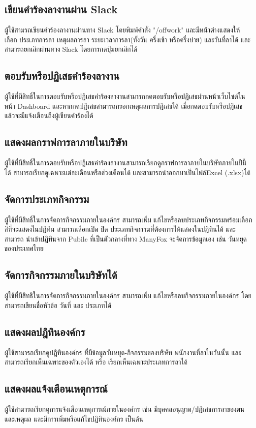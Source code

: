 \subsection{เขียนคำร้องลางานผ่าน Slack}
ผู้ใช้สามรถเขียนคำร้องลางานผ่านทาง Slack โดยพิมพ์คำสั่ง "/offwork" และมีหน้าต่างแสดงให้เลือก ประเภทการลา เหตุผลการลา ระยะเวลาการลา(ทั้งวัน ครึ่งเช้า หรือครึ่งบ่าย) และวันที่ลาได้
และสามารถยกเลิกผ่านทาง Slack โดยการกดปุ่มยกเลิกได้

\subsection{ตอบรับหรือปฎิเสธคำร้องลางาน}
ผู้ใช้ที่มีสิทธิ์ในการตอบรับหรือปฎิเสธคำร้องลางานสามารถกดตอบรับหรือปฎิเสธผ่านหน้าเว็บไซต์ในหน้า Dashboard และหากกดปฎิเสธสามารถกรอกเหตุผลการปฎิเสธได้ เมื่อกดตอบรับหรือปฎิเสธแล้วจะมีแจ้งเตือนถึงผู้เขียนคำร้องได้

\subsection{แสดงผลกราฟการลาภายในบริษัท}
ผู้ใช้ที่มีสิทธิ์ในการตอบรับหรือปฎิเสธคำร้องลางานสามารถเรียกดูกราฟการลาภายในบริษัทภายในปีนี้ได้ สามารถเรียกดูเฉพาะแต่ละเดือนหรือช่วงเดือนได้ และสามารถนำออกมาเป็นไฟล์Excel (.xlsx)ได้

\subsection{จัดการประเภทกิจกรรม}
ผู้ใช้ที่มีสิทธิ์ในการจัดการกิจกรรมภายในองค์กร สามารถเพิ่ม แก้ไขหรือลบประเภทกิจกรรมพร้อมเลือกสีที่จะแสดงในปฎิทิน สามารถเลือกเปิด ปิด ประเภทกิจกรรมที่ต้องการให้แสดงในปฎิทินได้
และสามารถ นำเข้าปฎิทินจาก Pubilc ที่เป็นตัวกลางที่ทาง ManyFox จะจัดการข้อมูลเอง เช่น วันหยุดของประเทศไทย
\subsection{จัดการกิจกรรมภายในบริษัทได้}
ผู้ใช้ที่มีสิทธิในการจัดการกิจกรรมภายในองค์กร สามารถเพิ่ม แก้ไขหรือลบกิจกรรมภายในองค์กร โดยสามารถเขียนชื่อหัวข้อ วันที่ และ ประเภทได้

\subsection{แสดงผลปฎิทินองค์กร}
ผู้ใช้สามารถเรียกดูปฎิทินองค์กร ที่มีข้อมูลวันหยุด-กิจกรรมของบริษัท พนักงานที่ลาในวันนั้น และสามารถเรียกเห็นเฉพาะของตัวเองได้ หรือ เรียกเห็นเฉพาะประเภทการลาได้
\subsection{แสดงผลแจ้งเตือนเหตุการณ์}
ผู้ใช้สามารถเรียกดูการแจ้งเตือนเหตุการณ์ภายในองค์กร เช่น มีบุคคลอนุญาต/ปฎิเสธการลาของตนและเหตุผล และมีการเพิ่มหรือแก้ไขปฎิทินองค์กร เป็นต้น

